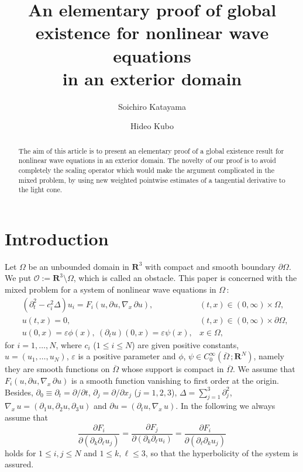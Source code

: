 \documentclass[12pt]{amsart}
\title[Global existence for nonlinear wave equations]
{An elementary proof of global existence for nonlinear wave equations
\\
in an exterior domain}
\author[S.~Katayama]{Soichiro Katayama}
\author[H.~Kubo]{Hideo Kubo}
\date{}
\newcommand{\R}{{\mathbf R}}
\newcommand{\pa}{\partial}
\numberwithin{equation}{section}
\begin{document}
\begin{abstract}
The aim of this article is to present an elementary proof of a global existence
result for nonlinear wave equations 
in an exterior domain.
The novelty of our proof is to avoid completely the scaling operator
which would make the argument complicated in the mixed problem, by using 
new weighted pointwise
estimates of a tangential derivative to the light cone.
\end{abstract}

\maketitle

\section{Introduction}
Let $\Omega$ be an unbounded domain in $\R^3$
with compact and smooth boundary $\partial \Omega$.
We put ${\mathcal O}:=\R^3 \setminus {\Omega}$, which is called
an obstacle. 
This paper is concerned with the mixed problem for 
a system of nonlinear wave equations in $\Omega$\,:
\begin{align}\label{ap1}
& (\partial_t^2-c_i^2\Delta) u_i =F_i(u, \partial u,\nabla_{\!x}\,\partial u),
& (t,x) \in (0,\infty)\times \Omega,
\\ \label{ap2}
& u(t,x)=0, & (t,x) \in (0,\infty)\times \partial\Omega,
\\ \label{ap3}
& u(0,x)=\varepsilon \phi(x),\ (\partial_t u)(0,x)=\varepsilon \psi(x), 
&  x\in \Omega,
\end{align}
for $i=1, \dots, N$, where
$c_i$ ($1\le i\le N$) are given positive constants,
$u=(u_1, \dots, u_N)$, 
$\varepsilon$ is a positive parameter and $\phi$, 
$\psi \in C^\infty_0(\overline{\Omega}\,;\R^N)$,
namely they are smooth functions on $\overline{\Omega}$ whose support is compact
in $\overline{\Omega}$.
We assume that $F_i(u,\partial u,\nabla_{\!x}\, \partial u)$ is a smooth function
vanishing to first order at the origin.
Besides, $\partial_0\equiv\partial_t=\partial/\partial t$, 
$\partial_j=\partial/\partial x_j$ ($j=1,2,3$),
$\Delta=\sum_{j=1}^3 \partial_j^2$, $\nabla_{\!x}\, u=(\partial_1 u, \partial_2 u, \partial_3 u)$
and $\partial u=(\partial_t u, \nabla_{\!x}\, u)$. 
In the following we always assume that
\begin{equation}
\frac{\pa F_i}{\pa(\pa_k\pa_\ell u_j)}=\frac{\pa F_j}{\pa(\pa_k\pa_\ell u_i)}
=\frac{\pa F_i}{\pa(\pa_\ell\pa_k u_j)}
\label{symmetric}
\end{equation}
holds for $1\le i, j\le N$ and $1\le k, \ell\le 3$, so that
the hyperbolicity of the system is assured.
\end{document}
